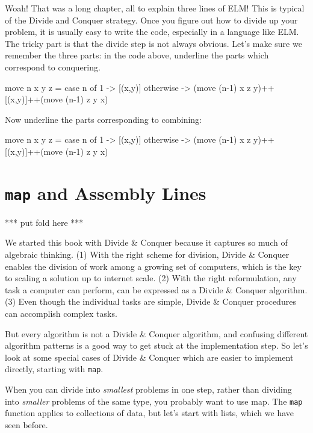 \documentclass[12pt]{amsbook}
\begin{document}
Woah!  That was a long chapter, all to explain three lines of ELM!  This is typical of the Divide and Conquer strategy.  Once you figure out how to divide up your problem, it is usually easy to write the code, especially in a language like ELM.  The tricky part is that the divide step is not always obvious.  Let's make sure we remember the three parts:  in the code above, underline the parts which correspond to conquering.

\begin{code}
move n x y z = case n of
                 1 ->         [(x,y)]
                 otherwise -> (move (n-1) x z y)++[(x,y)]++(move (n-1) z y x) 
\end{code}

Now underline the parts corresponding to combining:

\begin{code}
move n x y z = case n of
                 1         -> [(x,y)]
                 otherwise -> (move (n-1) x z y)++[(x,y)]++(move (n-1) z y x) 
\end{code}

\chapter{\texttt{map} and Assembly Lines}

*** put fold here ***

We started this book with Divide \& Conquer because it captures so much of algebraic thinking.
(1) With the right scheme for division,
Divide \& Conquer enables the division of work
among a growing set of computers, 
which is the key to scaling a solution up to 
internet scale.
(2) With the right reformulation, any task a computer can perform, can be expressed as a Divide \& Conquer algorithm.
(3) Even though the individual tasks are simple, Divide \& Conquer procedures can accomplish complex tasks.

But every algorithm is not a Divide \& Conquer algorithm, and confusing different algorithm patterns is a good way to get stuck at the implementation step.
So let's look at some special cases of Divide \& Conquer which are easier to implement directly, starting with \texttt{map}.

When you can divide into \emph{smallest} problems in one step, rather than dividing into \emph{smaller} problems of the same type, you probably want to use map.
The \texttt{map} function applies to collections of data, but let's start with lists, which we have seen before.
\end{document}
